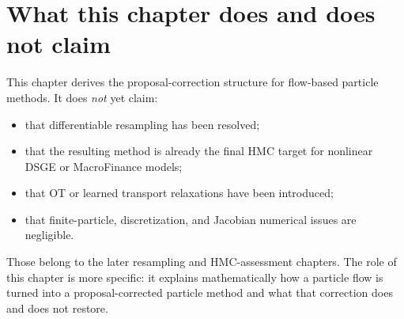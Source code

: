 \section{What this chapter does and does not claim}
\label{sec:bf-pfpf-chapter-boundary}

This chapter derives the proposal-correction structure for flow-based particle
methods.  It does \emph{not} yet claim:
\begin{itemize}
  \item that differentiable resampling has been resolved;
  \item that the resulting method is already the final HMC target for nonlinear
    DSGE or MacroFinance models;
  \item that OT or learned transport relaxations have been introduced;
  \item that finite-particle, discretization, and Jacobian numerical issues are
    negligible.
\end{itemize}
Those belong to the later resampling and HMC-assessment chapters.  The role of
this chapter is more specific: it explains mathematically how a particle flow is
turned into a proposal-corrected particle method and what that correction does
and does not restore.
